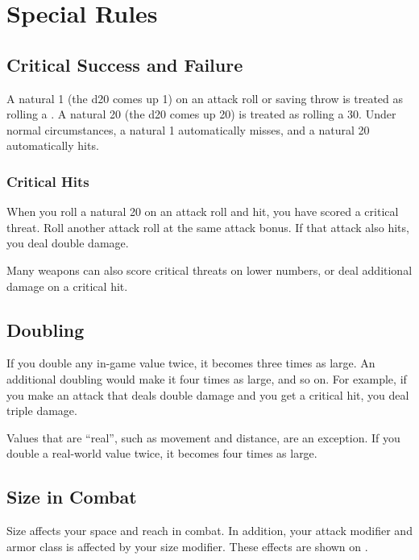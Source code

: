 \section{Special Rules}

\subsection{Critical Success and Failure}
A natural 1 (the d20 comes up 1) on an attack roll or saving throw is treated as rolling a . A natural 20 (the d20 comes up 20) is treated as rolling a 30. Under normal circumstances, a natural 1 automatically misses, and a natural 20 automatically hits.

\subsubsection{Critical Hits}
When you roll a natural 20 on an attack roll and hit, you have scored a critical threat. Roll another attack roll at the same attack bonus. If that attack also hits, you deal double damage.

Many weapons can also score critical threats on lower numbers, or deal additional damage on a critical hit.

\subsection{Doubling}
If you double any in-game value twice, it becomes three times as large. An additional doubling would make it four times as large, and so on. For example, if you make an attack that deals double damage and you get a critical hit, you deal triple damage.

 Values that are ``real'', such as movement and distance, are an exception. If you double a real-world value twice, it becomes four times as large. 

\subsection{Size in Combat}
Size affects your space and reach in combat. In addition, your attack modifier and armor class is affected by your size modifier. These effects are shown on . 

